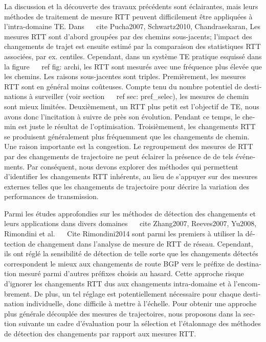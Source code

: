 \begin{otherlanguage}{french}
La discussion et la découverte des travaux précédents sont éclairantes, mais leurs méthodes de traitement de mesure RTT peuvent difficilement être appliquées à l'intra-domaine TE.
Dans ~ \ cite {Pucha2007, Schwartz2010, Chandrasekaran},
Les mesures RTT sont d'abord groupées par des chemins sous-jacents;
l'impact des changements de trajet est ensuite estimé par la comparaison des statistiques RTT associées, par ex. centiles.
Cependant, dans un système TE pratique esquissé dans la figure ~ \ ref {fig: archi}, les RTT sont mesurés avec une fréquence plus élevée que les chemins.
Les raisons sous-jacentes sont triples.
Premièrement, les mesures RTT sont en général moins coûteuses.
Compte tenu du nombre potentiel de destinations à surveiller (voir section ~ \ ref {sec: pref_selec}), les mesures de chemin sont mieux limitées.
Deuxièmement, un RTT plus petit est l'objectif de TE, nous avons donc l'incitation à suivre de près son évolution. Pendant ce temps, le chemin est juste le résultat de l'optimisation.
Troisièmement, les changements RTT se produisent généralement plus fréquemment que les changements de chemin.
Une raison importante est la congestion.
Le regroupement des mesures de RTT par des changements de trajectoire ne peut éclairer la présence de
de tels événements.
Par conséquent, nous devons explorer des méthodes qui permettent d'identifier les changements RTT inhérents, au lieu de s'appuyer sur des mesures externes telles que les changements de trajectoire pour décrire la variation des performances de transmission.

Parmi les études approfondies sur les méthodes de détection des changements et leurs applications dans divers domaines ~ \ cite {Zhang2007, Reeves2007, Yu2008},
Rimondini et al. ~ \ Cite {Rimondini2014} sont parmi les premiers à utiliser la détection de changement dans l'analyse de mesure de RTT de réseau.
Cependant, ils ont réglé la sensibilité de détection de telle sorte que les changements détectés correspondent le mieux aux changements de route BGP vers le préfixe de destination mesuré parmi d'autres préfixes choisis au hasard.
Cette approche risque d'ignorer les changements RTT dus aux changements intra-domaine et à l'encombrement.
De plus, un tel réglage est potentiellement nécessaire pour chaque destination individuelle, donc difficile à mettre à l'échelle.
Pour obtenir une approche plus générale découplée des mesures de trajectoires, nous proposons dans la section suivante un cadre d'évaluation pour la sélection et l'étalonnage des méthodes de détection des changements par rapport aux mesures RTT.


\end{otherlanguage}
